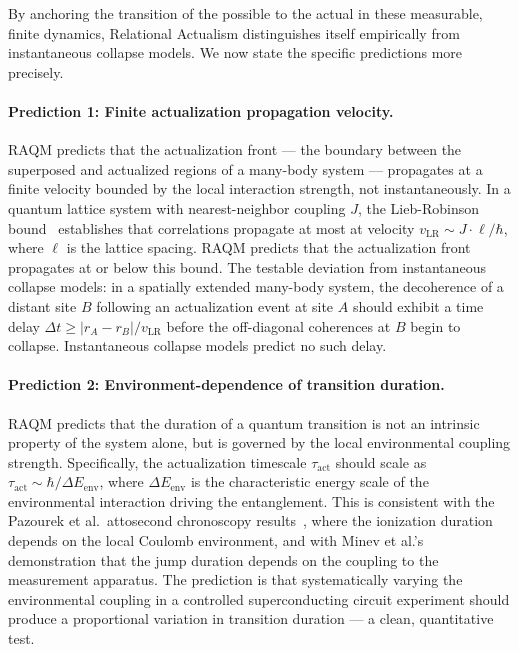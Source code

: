 \documentclass[11pt,a4paper]{article}
\theoremstyle{plain}
\theoremstyle{definition}
\theoremstyle{remark}
\begin{document}
By anchoring the transition of the possible to the actual in these measurable,
finite dynamics, Relational Actualism distinguishes itself empirically from
instantaneous collapse models. We now state the specific predictions more
precisely.

\paragraph{Prediction 1: Finite actualization propagation velocity.}
RAQM predicts that the actualization front --- the boundary between the superposed
and actualized regions of a many-body system --- propagates at a finite velocity
bounded by the local interaction strength, not instantaneously. In a quantum
lattice system with nearest-neighbor coupling $J$, the Lieb-Robinson
bound~\citep{LiebRobinson1972} establishes that correlations propagate at most at
velocity $v_{\mathrm{LR}} \sim J \cdot \ell / \hbar$, where $\ell$ is the lattice
spacing. RAQM predicts that the actualization front propagates at or below this
bound. The testable deviation from instantaneous collapse models: in a spatially
extended many-body system, the decoherence of a distant site $B$ following an
actualization event at site $A$ should exhibit a time delay $\Delta t \geq |r_A -
r_B| / v_{\mathrm{LR}}$ before the off-diagonal coherences at $B$ begin to
collapse. Instantaneous collapse models predict no such delay.

\paragraph{Prediction 2: Environment-dependence of transition duration.}
RAQM predicts that the duration of a quantum transition is not an intrinsic
property of the system alone, but is governed by the local environmental coupling
strength. Specifically, the actualization timescale $\tau_{\mathrm{act}}$ should
scale as $\tau_{\mathrm{act}} \sim \hbar / \Delta E_{\mathrm{env}}$, where
$\Delta E_{\mathrm{env}}$ is the characteristic energy scale of the environmental
interaction driving the entanglement. This is consistent with the Pazourek et al.\
attosecond chronoscopy results~\citep{Pazourek2015}, where the ionization duration
depends on the local Coulomb environment, and with Minev et al.'s demonstration
that the jump duration depends on the coupling to the measurement apparatus. The
prediction is that systematically varying the environmental coupling in a controlled
superconducting circuit experiment should produce a proportional variation in
transition duration --- a clean, quantitative test.
\end{document}
